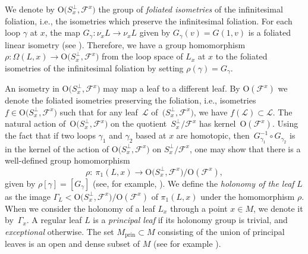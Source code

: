 \documentclass[pdftex]{sigma}
\numberwithin{equation}{section}
\theoremstyle{definition}
\newcommand{\Sp}{S} %
\newcommand{\prin}{\mathrm{prin}}
\newcommand{\fol}{\mathcal{F}}
\begin{document}
We denote by $\mathrm{O}\bigl(S^\perp_x,\fol^x\bigr)$ the group of \emph{foliated isometries} of the infinitesimal foliation, i.e., the isometries which preserve the infinitesimal foliation.
For each loop $\gamma$ at $x$, the map $G_\gamma\colon {\nu_x L\to \nu_x L}$ given by $G_\gamma(v) = G(1,v)$ is a foliated linear isometry (see \cite[Corollary~15]{MendesRadeschi2019}).
Therefore, we have a group homomorphism $\rho\colon\Omega(L,x)\to \mathrm{O}\bigl(S^\perp_x,\fol^x\bigr)$ from the loop space of $L_x$ at $x$ to the foliated isometries of the infinitesimal foliation by setting $\rho(\gamma) = G_\gamma$.

An isometry in $\mathrm{O}\bigl(S^\perp_x,\fol^x\bigr)$ may map a leaf to a different leaf. By $\mathrm{O}(\fol^{x})$ we denote the foliated isometries preserving the foliation, i.e., isometries $f\in \mathrm{O}\bigl(S^\perp_x,\fol^x\bigr)$ such that for any leaf~$\mathcal{L}$ of~$\bigl(S^\perp_x,\fol^x\bigr)$, we have $f(\mathcal{L})\subset \mathcal{L}$. The natural action of~$\mathrm{O}\bigl(S^\perp_{x},\fol^x\bigr)$ on the quotient~$\Sp^\perp_x/\fol^x$ has kernel~$\mathrm{O}(\fol^x)$.
Using the fact that if two loops $\gamma_1$ and $\gamma_2$ based at $x$ are homotopic, then~$G_{\gamma_1}^{-1}\circ G_{\gamma_2}$ is in the kernel of the action of $\mathrm{O}\bigl(\Sp^\perp_x,\fol^x\bigr)$ on $\Sp^\perp_x/\fol^x$, one may show that there is a well-defined group homomorphism
\[
	\rho\colon\ \pi_1(L,x)\to \mathrm{O}\bigl(\Sp^\perp_x,\fol^x\bigr)/\mathrm{O}(\fol^x),
\]
given by $\rho[\gamma] = [G_\gamma]$ (see, for example, \cite[Lemma 2.4 and Proposition 2.5]{Corro}). We define the \emph{holonomy of the leaf} $L$ as the image $\Gamma_L< \mathrm{O}\bigl(\Sp^\perp_x,\fol^x\bigr)/\mathrm{O}(\fol^{x})$ of $\pi_1(L,x)$ under the homomorphism $\rho$. When we consider the holonomy of a leaf $L_x$ through a point $x\in M$, we denote it by~$\Gamma_x$. A regular leaf $L$ is a \emph{principal leaf} if its holonomy group is trivial, and \emph{exceptional} otherwise. The set $M_\prin\subset M$ consisting of the union of principal leaves is an open and dense subset of $M$ (see for example \cite[Proposition 2.8]{Corro}).

	
		
\end{document}
